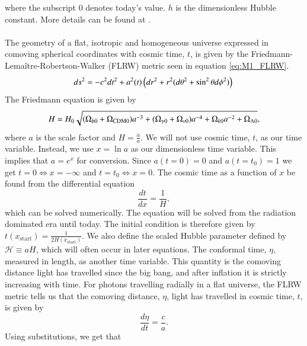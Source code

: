 \documentclass{aa}
\begin{document}
\vspace*{0.3cm}
\noindent
where the subscript 0 denotes today's value. $h$ is the dimensionless Hubble constant. More details can be found at \cite{winther:2023}. \\ \\

\noindent
The geometry of a flat, isotropic and homogeneous universe expressed in comoving spherical coordinates with cosmic time, $t$, is given by the Friedmann-Lemaître-Robertson-Walker (FLRW) metric seen in equation \ref{eq:M1_FLRW}.
\begin{equation}\label{eq:M1_FLRW}
   ds^2 = -c^2 dt^2 + a^2(t) \left(dr^2 + r^2 (d\theta^2 + \sin^2\theta 
d\phi^2)\right) \\
\end{equation}
The Friedmann equation is given by
\begin{equation}\label{Friedmann}
      H = H_0 \sqrt{(\Omega_{b0}+\Omega_{\rm CDM 0})a^{-3} + (\Omega_{\gamma 0} + \Omega_{\nu 0}) a^{-4} + \Omega_{k 0} a^{-2} + \Omega_{\Lambda 0}},
\end{equation}
where $a$ is the scale factor and  $H = \frac{\dot{a}}{a}$. We will not use cosmic time, $t$, as our time variable.
Instead, we use $x=\ln a$ as our dimensionless time variable. This implies that $a = e^x$ for conversion. Since $a(t=0)=0$ and $a(t=t_0)=1$
we get $t=0 \iff x = -\infty$ and $t=t_0 \iff x = 0$. The cosmic time as a function of $x$ be found from the differential equation 
\begin{equation}\label{cosmic_time_differential_equation}
      \frac{dt}{dx} = \frac{1}{H},
\end{equation}
which can be solved numerically. The equation will be solved from the radiation dominated era until today. The initial condition is therefore given by $t(x_\mathrm{start})=\frac{1}{2H(x_\mathrm
{start})}$. We also define the scaled Hubble parameter defined by $\mathcal{H}\equiv aH$, which will often occur in later equations.
The conformal time, $\eta$, measured in length, as another time variable. This quantity is the comoving distance light has travelled since the big bang,
and after inflation it is strictly increasing with time. For photons travelling radially in a flat universe, the FLRW metric tells us that the comoving distance, $\eta$, 
light has travelled in cosmic time, $t$, is given by
\begin{equation}
   \frac{d\eta}{dt} = \frac{c}{a}. 
\end{equation}
Using substitutions, we get that
\end{document}
